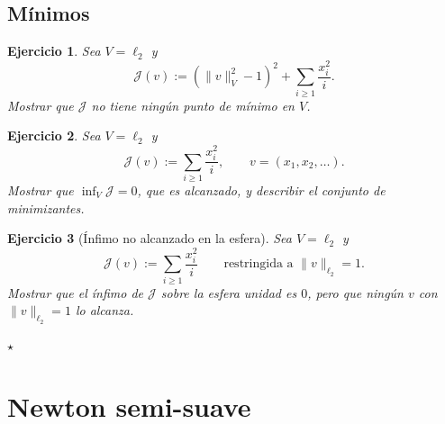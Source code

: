\documentclass[11pt]{report}
\newtheorem{ex}{Ejercicio}
\begin{document}
\section{Mínimos}

\begin{ex}
Sea $V=\ell_2$ y
\[
\mathcal{J}(v):=
\left ( \| v \|^2_V - 1 
\right )^2 +
\sum_{i\geq1} \frac{x_i^2}{i}.
\]
Mostrar que $\mathcal{J}$ no tiene ningún punto de mínimo en $V$.
\end{ex}

\begin{ex} %
Sea $V=\ell_2$ y
\[
\mathcal{J}(v):=\sum_{i\geq 1}\frac{x_i^2}{i},\qquad v=(x_1,x_2,\dots).
\]
Mostrar que $\inf_V\mathcal J=0$, que es alcanzado, y describir el conjunto de
minimizantes.
\end{ex}


\begin{ex}[\'Infimo no alcanzado en la esfera]
Sea $V=\ell_2$ y
\[
\mathcal{J}(v):=\sum_{i\geq 1}\frac{x_i^2}{i}
\qquad\text{restringida a }\|v\|_{\ell_2}=1.
\]
Mostrar que el \'infimo de $\mathcal J$ sobre la esfera unidad es $0$, pero que
ning\'un $v$ con $\|v\|_{\ell_2}=1$ lo alcanza.
\end{ex}


\begin{center}
    $\star$
\end{center}


\chapter{Newton semi-suave}
\end{document}
